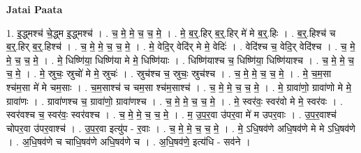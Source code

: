 \documentclass[17pt]{extarticle}
\begin{document}
\textbf{Jatai Paata} \newline

1. इ॒द्ध्मश्च॑ चे॒द्ध्म इ॒द्ध्मश्च॑ । . च॒ मे॒ मे॒ च॒ च॒ मे॒ । . मे॒ ब॒र्॒.हिर् ब॒र्॒.हिर् मे॑ मे ब॒र्॒.हिः । . ब॒र्॒.हिश्च॑ च ब॒र्॒.हिर् ब॒र्॒.हिश्च॑ । . च॒ मे॒ मे॒ च॒ च॒ मे॒ । . मे॒ वेदि॒र् वेदि॑र् मे मे॒ वेदिः॑ । . वेदि॑श्च च॒ वेदि॒र् वेदि॑श्च । . च॒ मे॒ मे॒ च॒ च॒ मे॒ । . मे॒ धिष्णि॑या॒ धिष्णि॑या मे मे॒ धिष्णि॑याः । . धिष्णि॑याश्च च॒ धिष्णि॑या॒ धिष्णि॑याश्च । . च॒ मे॒ मे॒ च॒ च॒ मे॒ । . मे॒ स्रुचः॒ स्रुचो॑ मे मे॒ स्रुचः॑ । . स्रुच॑श्च च॒ स्रुचः॒ स्रुच॑श्च । . च॒ मे॒ मे॒ च॒ च॒ मे॒ । . मे॒ च॒म॒सा श्च॑म॒सा मे॑ मे चम॒साः । . च॒म॒साश्च॑ च चम॒सा श्च॑म॒साश्च॑ । . च॒ मे॒ मे॒ च॒ च॒ मे॒ । . मे॒ ग्रावा॑णो॒ ग्रावा॑णो मे मे॒ ग्रावा॑णः । . ग्रावा॑णश्च च॒ ग्रावा॑णो॒ ग्रावा॑णश्च । . च॒ मे॒ मे॒ च॒ च॒ मे॒ । . मे॒ स्वर॑वः॒ स्वर॑वो मे मे॒ स्वर॑वः । . स्वर॑वश्च च॒ स्वर॑वः॒ स्वर॑वश्च । . च॒ मे॒ मे॒ च॒ च॒ मे॒ । . म॒ उ॒प॒र॒वा उ॑पर॒वा मे॑ म उपर॒वाः । . उ॒प॒र॒वाश्च॑ चोपर॒वा उ॑पर॒वाश्च॑ । . उ॒प॒र॒वा इत्यु॑प - र॒वाः । . च॒ मे॒ मे॒ च॒ च॒ मे॒ । . मे॒ ऽधि॒षव॑णे अधि॒षव॑णे मे मे ऽधि॒षव॑णे । . अ॒धि॒षव॑णे च चाधि॒षव॑णे अधि॒षव॑णे च । . अ॒धि॒षव॑णे॒ इत्य॑धि - सव॑ने । \newline
\end{document}
